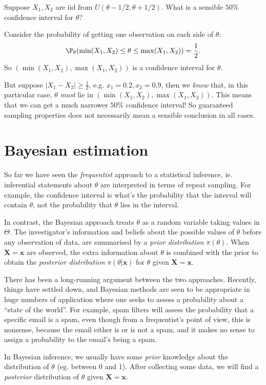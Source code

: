 \documentclass[a4paper]{article}
\begin{document}
\begin{eg}
  Suppose $X_1, X_2$ are iid from $U(\theta - 1/2, \theta + 1/2)$. What is a sensible $50\%$ confidence interval for $\theta$?

  Consider the probability of getting one observation on each side of $\theta$:
  \[
    \P_\theta(\min(X_1, X_2) \leq \theta \leq \max(X_1, X_2)) = \frac{1}{2}.
  \]
  So $(\min(X_1, X_2), \max (X_1, X_2))$ is a confidence interval for $\theta$.

  But suppose $|X_1 - X_2| \geq \frac{1}{2}$, e.g. $x_1 = 0.2, x_2 = 0.9$, then we \emph{know} that, in this particular case, $\theta$ \emph{must} lie in $(\min (X_1, X_2), \max(X_1, X_2))$. This means that we can get a much narrower $50\%$ confidence interval! So guaranteed sampling properties does not necessarily mean a sensible conclusion in all cases.
\end{eg}
\section{Bayesian estimation}
So far we have seen the \emph{frequentist} approach to a statistical inference, ie. inferential statements about $\theta$ are interpreted in terms of repeat sampling. For example, the confidence interval is what's the probability that the interval will contain $\theta$, not the probability that $\theta$ lies in the interval.

In contrast, the Bayesian approach treats $\theta$ as a random variable taking values in $\Theta$. The investigator's information and beliefs about the possible values of $\theta$ before any observation of data, are summarised by a \emph{prior distribution} $\pi(\theta)$. When $\mathbf{X} = \mathbf{x}$ are observed, the extra information about $\theta$ is combined with the prior to obtain the \emph{posterior distribution} $\pi(\theta|\mathbf{x})$ for $\theta$ given $\mathbf{X} = \mathbf{x}$.

There has been a long-running argument between the two approaches. Recently, things have settled down, and Bayesian methods are seen to be appropriate in huge numbers of application where one seeks to assess a probability about a ``state of the world''. For example, spam filters will assess the probability that a specific email is a spam, even though from a frequentist's point of view, this is nonsense, because the email either is or is not a spam, and it makes no sense to assign a probability to the email's being a spam.

In Bayesian inference, we usually have some \emph{prior} knowledge about the distribution of $\theta$ (eg. between $0$ and $1$). After collecting some data, we will find a \emph{posterior} distribution of $\theta$ given $\mathbf{X} = \mathbf{x}$.
\end{document}
